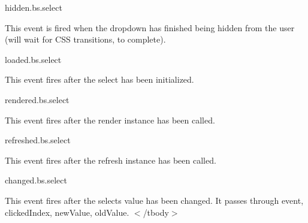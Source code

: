 hidden.\+bs.\+select 

This event is fired when the dropdown has finished being hidden from the user (will wait for C\+SS transitions, to complete).  

loaded.\+bs.\+select 

This event fires after the select has been initialized.  

rendered.\+bs.\+select 

This event fires after the render instance has been called.  

refreshed.\+bs.\+select 

This event fires after the refresh instance has been called.  

changed.\+bs.\+select 

This event fires after the select\textquotesingle{}s value has been changed. It passes through event, clicked\+Index, new\+Value, old\+Value.  $<$/tbody$>$ 


 